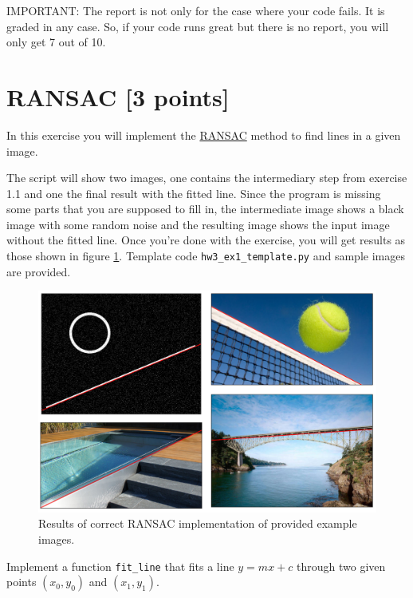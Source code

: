 \documentclass[12pt]{article}
\begin{document}
IMPORTANT: The report is not only for the case where your code fails. It is graded in any case. So, if your code runs great but there is no report, you will only get 7 out of 10.
\newpage

\section{RANSAC [3 points]}

In this exercise you will implement the \href{https://en.wikipedia.org/wiki/Random_sample_consensus}{RANSAC} method to find lines in a given image. 

The script will show two images, one contains the intermediary step from exercise 1.1 and one the final result with the fitted line. Since the program is missing some parts that you are supposed to fill in, the intermediate image shows a black image with some random noise and the resulting image shows the input image without the fitted line. Once you're done with the exercise, you will get results as those shown in figure \ref{fig:ransac}.
Template code \texttt{hw3\_ex1\_template.py} and sample images are provided.


\begin{figure}[h]
\centering
\includegraphics[width=\textwidth]{ransac_examples}
\caption{Results of correct RANSAC implementation of provided example images.}
\label{fig:ransac}
\end{figure}
  
\begin{question}
\label{find_line}
Implement a function \texttt{fit\_line} that fits a line $y=mx+c$ through two given points $(x_0,y_0)$ and $(x_1,y_1)$.
\end{question}
\end{document}
